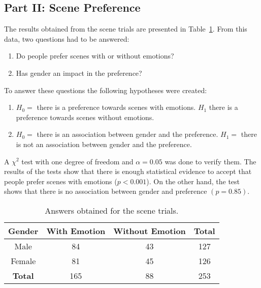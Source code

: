 \subsection{Part II: Scene Preference}

The results obtained from the scene trials are presented in Table~\ref{table:preference_selection}. From this data, two questions had to be answered:
\begin{enumerate}
	\item Do people prefer scenes with or without emotions?
	\item Has gender an impact in the preference?
\end{enumerate}
To answer these questions the following hypotheses were created:
\begin{enumerate}
	\item $H_0 =$ there is a preference towards scenes with emotions. $H_1$ there is a preference towards scenes without emotions. 
	\item $H_0 =$ there is an association between gender and the preference. $H_1 =$ there is not an association between gender and the preference. 
\end{enumerate}
A $\chi^2$ test with one degree of freedom and $\alpha = 0.05$ was done to verify them. The results of the tests show that there is enough statistical evidence to accept that people prefer scenes with emotions ($p<0.001$). On the other hand, the test shows that there is no association between gender and preference $(p=0.85)$.

\begin{table}
\centering
		\caption{Answers obtained for the scene trials.}		
		\label{table:preference_selection}
			\begin{tabular}{|c|c|c|c|}
			\hline
			\textbf{Gender}&\textbf{With Emotion}&\textbf{Without Emotion}&\textbf{Total}\\
			\hline
			Male & 84 & 43 & 127\\
			\hline
			Female & 81 & 45 & 126\\
			\hline
			\textbf{Total} & 165 & 88 & 253\\
			\hline
			\end{tabular}
\end{table}
